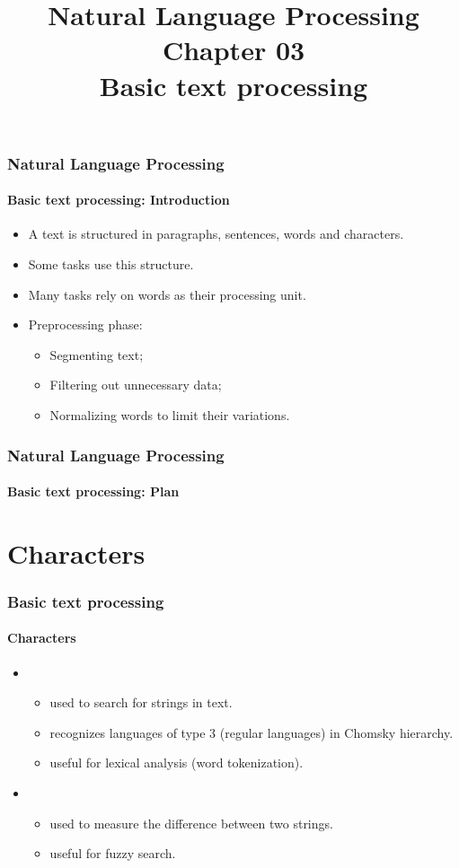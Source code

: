 \documentclass[xcolor=table]{beamer}
\title[ESI - NLP: 03- Basic text processing]%
{Natural Language Processing\\Chapter 03\\Basic text processing}
\begin{document}
	
\begin{frame}
\frametitle{Natural Language Processing}
\framesubtitle{Basic text processing: Introduction}

\begin{itemize}
	\item A text is structured in paragraphs, sentences, words and characters.
	\item Some tasks use this structure.
	\item Many tasks rely on words as their processing unit.
	\item Preprocessing phase:
	\begin{itemize}
		\item Segmenting text;
		\item Filtering out unnecessary data;
		\item Normalizing words to limit their variations.
	\end{itemize}
\end{itemize}

\end{frame}


\begin{frame}
\frametitle{Natural Language Processing}
\framesubtitle{Basic text processing: Plan}

\begin{multicols}{2}
\tableofcontents
\end{multicols}
\end{frame}

\section{Characters}

\begin{frame}
\frametitle{Basic text processing}
\framesubtitle{Characters}

\begin{itemize}
	\item {}
	\begin{itemize}
		\item used to search for strings in text.
		\item recognizes languages of type 3 (regular languages) in Chomsky hierarchy.
		\item useful for lexical analysis (word tokenization).
	\end{itemize}
	\item {}
	\begin{itemize}
		\item used to measure the difference between two strings.
		\item useful for fuzzy search.
	\end{itemize}
\end{itemize}

\end{frame}
\end{document}
